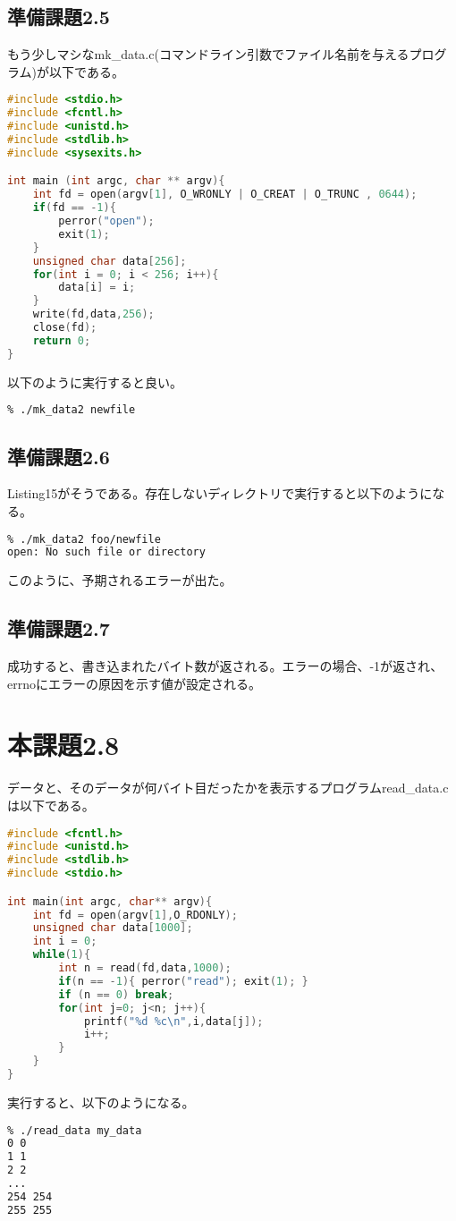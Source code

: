 \documentclass{ltjsarticle}
\begin{document}
\subsection{準備課題2.5}
もう少しマシなmk\_data.c(コマンドライン引数でファイル名前を与えるプログラム)が以下である。
\begin{lstlisting}[caption=mk\_data2.c,language=C]
#include <stdio.h>
#include <fcntl.h>
#include <unistd.h>
#include <stdlib.h>
#include <sysexits.h>

int main (int argc, char ** argv){
    int fd = open(argv[1], O_WRONLY | O_CREAT | O_TRUNC , 0644);
    if(fd == -1){
        perror("open");
        exit(1);
    }
    unsigned char data[256];
    for(int i = 0; i < 256; i++){
        data[i] = i;
    }
    write(fd,data,256);
    close(fd);
    return 0;
}
\end{lstlisting}
以下のように実行すると良い。
\begin{lstlisting}[caption=mk\_data2.c 実効,language=bash]
% gcc mk_data2.c -o mk_data2
% ./mk_data2 newfile
\end{lstlisting}

\subsection{準備課題2.6}
Listing15がそうである。存在しないディレクトリで実行すると以下のようになる。
\begin{lstlisting}[caption=mk\_data2 存在しないディレクトリで実効,language=bash]
% gcc mk_data2.c -o mk_data2
% ./mk_data2 foo/newfile
open: No such file or directory
\end{lstlisting}
このように、予期されるエラーが出た。

\subsection{準備課題2.7}
成功すると、書き込まれたバイト数が返される。エラーの場合、-1が返され、errnoにエラーの原因を示す値が設定される。

\section{本課題2.8}
データと、そのデータが何バイト目だったかを表示するプログラムread\_data.cは以下である。
\begin{lstlisting}[caption=read\_data.c,language=C]
#include <fcntl.h>
#include <unistd.h>
#include <stdlib.h>
#include <stdio.h>

int main(int argc, char** argv){
    int fd = open(argv[1],O_RDONLY);
    unsigned char data[1000];
    int i = 0;
    while(1){
        int n = read(fd,data,1000);
        if(n == -1){ perror("read"); exit(1); }
        if (n == 0) break;
        for(int j=0; j<n; j++){
            printf("%d %c\n",i,data[j]);
            i++;
        }
    }
}
\end{lstlisting}
実行すると、以下のようになる。
\begin{lstlisting}[caption=read\_data.c 実行,language=bash]
% gcc read_data.c -o read_data
% ./read_data my_data
0 0
1 1
2 2
...
254 254
255 255
\end{lstlisting}
\end{document}
